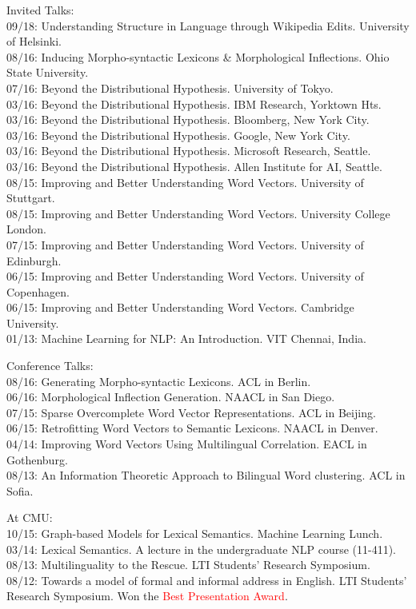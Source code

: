 \documentclass[margin,line]{res}
\begin{document}
\begin{resume}
\begin{hangparas}{.25in}{1}
Invited Talks:\\
09/18: Understanding Structure in Language through Wikipedia Edits. University of Helsinki.\\
08/16: Inducing Morpho-syntactic Lexicons \& Morphological Inflections. Ohio State University.\\
07/16: Beyond the Distributional Hypothesis. University of Tokyo.\\
03/16: Beyond the Distributional Hypothesis. IBM Research, Yorktown Hts.\\
03/16: Beyond the Distributional Hypothesis. Bloomberg, New York City.\\
03/16: Beyond the Distributional Hypothesis. Google, New York City.\\
03/16: Beyond the Distributional Hypothesis. Microsoft Research, Seattle.\\
03/16: Beyond the Distributional Hypothesis. Allen Institute for AI, Seattle.\\
08/15: Improving and Better Understanding Word Vectors. University of Stuttgart.\\
08/15: Improving and Better Understanding Word Vectors. University College London.\\
07/15: Improving and Better Understanding Word Vectors. University of Edinburgh.\\
06/15: Improving and Better Understanding Word Vectors. University of Copenhagen.\\
06/15: Improving and Better Understanding Word Vectors. Cambridge University.\\
01/13: Machine Learning for NLP: An Introduction. VIT Chennai, India.

Conference Talks:\\
08/16: Generating Morpho-syntactic Lexicons. ACL in Berlin.\\
06/16: Morphological Inflection Generation. NAACL in San Diego.\\
07/15: Sparse Overcomplete Word Vector Representations. ACL in Beijing.\\
06/15: Retrofitting Word Vectors to Semantic Lexicons. NAACL in Denver.\\
04/14: Improving Word Vectors Using Multilingual Correlation. EACL in Gothenburg.\\
08/13: An Information Theoretic Approach to Bilingual Word clustering. ACL in Sofia.


At CMU:\\
10/15: Graph-based Models for Lexical Semantics. Machine Learning Lunch.\\
03/14: Lexical Semantics. A lecture in the undergraduate NLP course (11-411).\\
08/13: Multilinguality to the Rescue. LTI Students' Research Symposium.\\
08/12: Towards a model of formal and informal address in English. LTI Students' Research Symposium. Won the \textcolor{red}{Best Presentation Award}.


\end{hangparas}
\end{resume}
\end{document}

